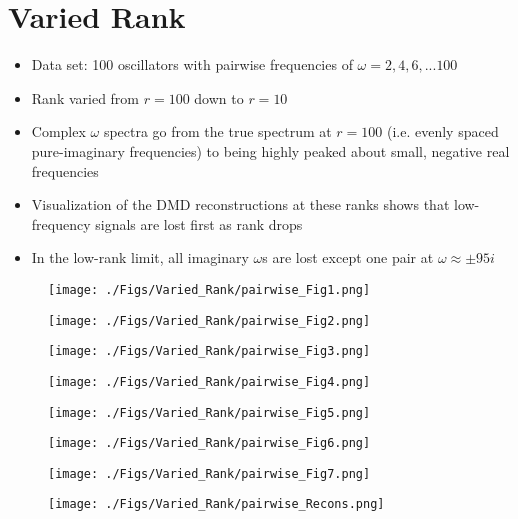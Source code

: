 \documentclass[11pt,reqno]{amsart}
\begin{document}
\section{Varied Rank}
\begin{itemize}
\item
Data set: 100 oscillators with pairwise frequencies of $\omega = 2, 4, 6,... 100$
\item
Rank varied from $r=100$ down to $r = 10$
\item
Complex $\omega$ spectra go from the true spectrum at $r=100$ (i.e. evenly spaced pure-imaginary frequencies) to being highly peaked about small, negative real frequencies
\item
Visualization of the DMD reconstructions at these ranks shows that low-frequency signals are lost first as rank drops
\item
In the low-rank limit, all imaginary $\omega$s are lost except one pair at $\omega \approx \pm 95i$

\end{itemize}
\begin{figure}[htb!]
\texttt{[image: ./Figs/Varied\_Rank/pairwise\_Fig1.png]}
\end{figure}
\begin{figure}[htb!]
\texttt{[image: ./Figs/Varied\_Rank/pairwise\_Fig2.png]}
\end{figure}
\begin{figure}[htb!]
\texttt{[image: ./Figs/Varied\_Rank/pairwise\_Fig3.png]}
\end{figure}
\begin{figure}[htb!]
\texttt{[image: ./Figs/Varied\_Rank/pairwise\_Fig4.png]}
\end{figure}
\begin{figure}[htb!]
\texttt{[image: ./Figs/Varied\_Rank/pairwise\_Fig5.png]}
\end{figure}
\begin{figure}[htb!]
\texttt{[image: ./Figs/Varied\_Rank/pairwise\_Fig6.png]}
\end{figure}
\begin{figure}[htb!]
\texttt{[image: ./Figs/Varied\_Rank/pairwise\_Fig7.png]}
\end{figure}
\begin{figure}[htb!]
\texttt{[image: ./Figs/Varied\_Rank/pairwise\_Recons.png]}
\end{figure}
\end{document}
